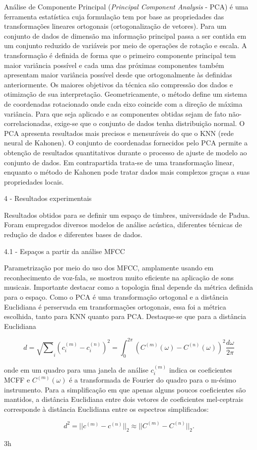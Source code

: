 Análise de Componente Principal (\textit{Principal Component Analysis} - PCA) é uma ferramenta estatística cuja formulação tem por base as propriedades das transformações lineares ortogonais (ortogonalização de vetores). Para um conjunto de dados de dimensão ma informação principal passa a ser contida em um conjunto reduzido de variáveis por meio de operações de rotação e escala. A transformação é definida de forma que o primeiro componente principal tem maior variância possível e cada uma das próximas componentes também apresentam maior variância possível desde que ortogonalmente às definidas anteriormente. Os maiores objetivos da técnica são compressão dos dados e otimização de sua interpretação. Geometricamente, o método define um sistema de coordenadas rotacionado onde cada eixo coincide com a direção de máxima variância. Para que seja aplicado e as componentes obtidas sejam de fato não-correlacionadas, exige-se que o conjunto de dados tenha distribuição normal.
O PCA apresenta resultados mais precisos e mensuráveis do que o KNN (rede neural de Kahonen). O conjunto de coordenadas fornecidos pelo PCA permite a obtenção de resultados quantitativos durante o processo de ajuste de modelo ao conjunto de dados. Em contrapartida trata-se de uma transformação linear, enquanto o método de Kahonen pode tratar dados mais complexos graças a suas propriedades locais.

4 - Resultados experimentais

Resultados obtidos para se definir um espaço de timbres, universidade de Padua. Foram empregados diversos modelos de análise acústica, diferentes técnicas de redução de dados e diferentes bases de dados.

4.1 - Espaços a partir da análise MFCC

Parametrização por meio do uso dos MFCC, amplamente usando em reconhecimento de voz-fala, se mostrou muito eficiente na aplicação de sons musicais. Importante destacar como a topologia final depende da métrica definida para o espaço. Como o PCA é uma transformação ortogonal e a distância Euclidiana é perservada em transformações ortogonais, essa foi a métrica escolhida, tanto para KNN quanto para PCA. Destaque-se que para a distância Euclidiana 

$$
d = \sqrt \sum_i (c_i^{(m)} - c_i^{(n)})^2 = \int_0^{2 \pi} ( C^{(m)}(\omega) - C^{(n)}(\omega) )^2 \frac{d \omega}{2 \pi}
$$

onde em um quadro para uma janela de análise $ c_i^{(m)} $ indica os coeficientes MCFF e $ C^{(m)} (\omega) $ é a transformada de Fourier do quadro para o m-ésimo instrumento. Para a simplificação em que apenas alguns poucos coeficientes são mantidos, a distância Euclidiana entre dois vetores de coeficientes mel-ceptrais corresponde à distância Euclidiana entre os espectros simplificados:

$$
d^2 = || c^{(m)} - c^{(n)} ||_2 \approx || C^{(m)} - C^{(n)} ||_2.
$$

3h
